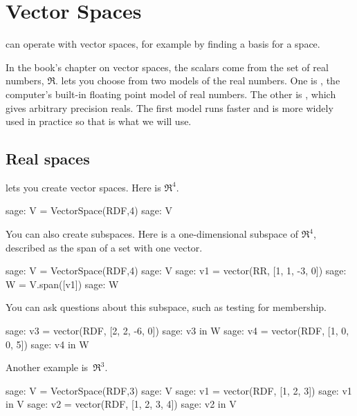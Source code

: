 \chapter{Vector Spaces}

\Sage{} can operate with vector spaces, for example by finding a basis for
a space.

In the book's chapter on vector spaces, the scalars come
from the set of real numbers, $\Re$.
\Sage{} lets you choose from two models of the real numbers.
One is , the computer's built-in floating point
model of real numbers.
The other is , which gives arbitrary precision 
reals.
The first model runs faster
and is more widely used in practice so that is what we will use.
 




\section{Real spaces}

\Sage{} lets you create vector spaces.
Here is $\Re^4$.
\begin{sagecommandline}
sage: V = VectorSpace(RDF,4)
sage: V
\end{sagecommandline}
You can also create subspaces.
Here is a one-dimensional subspace of $\Re^4$, described as the span
of a set with one vector.
\begin{sagecommandline}
sage: V = VectorSpace(RDF,4)
sage: V
sage: v1 = vector(RR, [1, 1, -3, 0])
sage: W = V.span([v1])
sage: W
\end{sagecommandline}

You can ask \Sage{} questions about this subspace, such as 
testing for membership. 
\begin{sagecommandline}
sage: v3 = vector(RDF, [2, 2, -6, 0])
sage: v3 in W
sage: v4 = vector(RDF, [1, 0, 0, 5])
sage: v4 in W
\end{sagecommandline}

Another example is~$\Re^3$.
\begin{sagecommandline}
sage: V = VectorSpace(RDF,3)
sage: V
sage: v1 = vector(RDF, [1, 2, 3])
sage: v1 in V
sage: v2 = vector(RDF, [1, 2, 3, 4])
sage: v2 in V
\end{sagecommandline}


